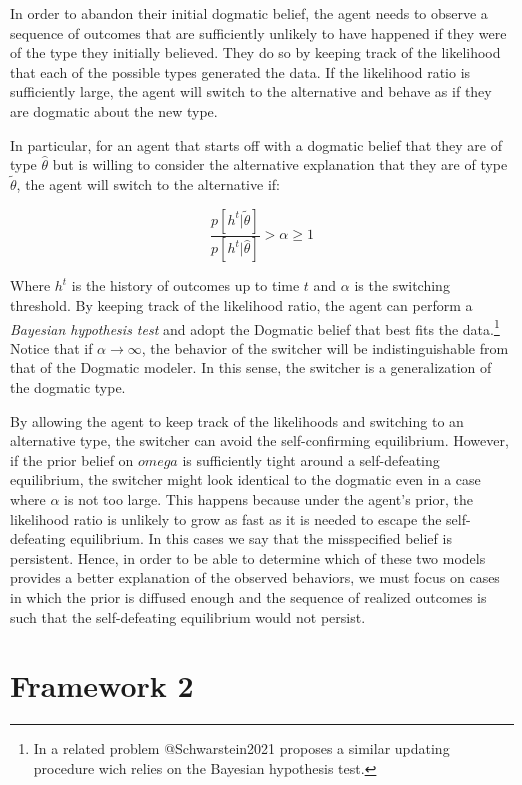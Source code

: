 \documentclass[
  12pt,
]{article}
\begin{document}
In order to abandon their initial dogmatic belief, the agent needs to
observe a sequence of outcomes that are sufficiently unlikely to have
happened if they were of the type they initially believed. They do so by
keeping track of the likelihood that each of the possible types
generated the data. If the likelihood ratio is sufficiently large, the
agent will switch to the alternative and behave as if they are dogmatic
about the new type.

In particular, for an agent that starts off with a dogmatic belief that
they are of type \(\hat{\theta}\) but is willing to consider the
alternative explanation that they are of type \(\tilde{\theta}\), the
agent will switch to the alternative if:

\[\frac{p[h^t|\tilde{\theta}]}{p[h^t|\hat{\theta}]} > \alpha\geq 1\]

Where \(h^t\) is the history of outcomes up to time \(t\) and \(\alpha\)
is the switching threshold. By keeping track of the likelihood ratio,
the agent can perform a \emph{Bayesian hypothesis test} and adopt the
Dogmatic belief that best fits the
data.\footnote{In a related problem @Schwarstein2021 proposes a similar updating procedure wich relies on the Bayesian 
hypothesis test.} Notice that if \(\alpha \to \infty\), the behavior of
the switcher will be indistinguishable from that of the Dogmatic
modeler. In this sense, the switcher is a generalization of the dogmatic
type.

By allowing the agent to keep track of the likelihoods and switching to
an alternative type, the switcher can avoid the self-confirming
equilibrium. However, if the prior belief on \(omega\) is sufficiently
tight around a self-defeating equilibrium, the switcher might look
identical to the dogmatic even in a case where \(\alpha\) is not too
large. This happens because under the agent's prior, the likelihood
ratio is unlikely to grow as fast as it is needed to escape the
self-defeating equilibrium. In this cases we say that the misspecified
belief is persistent. Hence, in order to be able to determine which of
these two models provides a better explanation of the observed
behaviors, we must focus on cases in which the prior is diffused enough
and the sequence of realized outcomes is such that the self-defeating
equilibrium would not persist.

\hypertarget{framework-2}{%
\section{Framework 2}\label{framework-2}}
\end{document}
